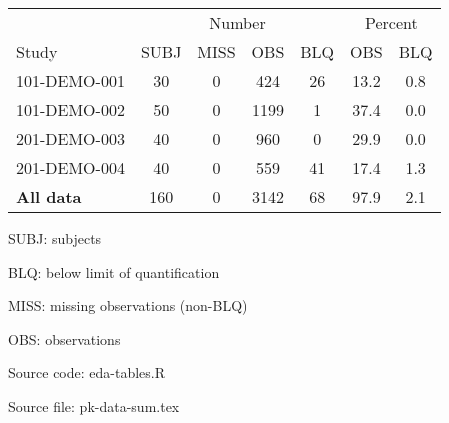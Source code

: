 \setlength{\tabcolsep}{5pt} 
\begin{threeparttable}
\renewcommand{\arraystretch}{1.3}
\begin{tabular}[h]{lcccccc}
\hline
\multicolumn{1}{c}{} & \multicolumn{4}{c}{Number} & \multicolumn{2}{c}{Percent} \\
\cmidrule(lr){2-5}
\cmidrule(lr){6-7}
Study & SUBJ & MISS & OBS & BLQ & OBS & BLQ \\
\hline
101-DEMO-001 & 30 & 0 & 424 & 26 & 13.2 & 0.8 \\
101-DEMO-002 & 50 & 0 & 1199 & 1 & 37.4 & 0.0 \\
201-DEMO-003 & 40 & 0 & 960 & 0 & 29.9 & 0.0 \\
201-DEMO-004 & 40 & 0 & 559 & 41 & 17.4 & 1.3 \\
\hline \hline {\bf All data} & 160 & 0 & 3142 & 68 & 97.9 & 2.1 \\
\hline
\end{tabular}
\begin{tablenotes}[flushleft]
\item SUBJ: subjects
\item BLQ: below limit of quantification
\item MISS: missing observations (non-BLQ)
\item OBS: observations
\item Source code: eda-tables.R
\item Source file: pk-data-sum.tex
\end{tablenotes}
\end{threeparttable}

